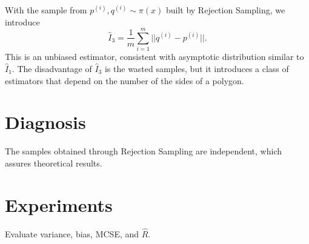\documentclass[a4paper,10pt, notitlepage]{report}
\begin{document}
With the sample from $p^{(i)}, q^{(i)} \sim \pi(x)$ built by Rejection Sampling, we
introduce 
$$
\hat{I}_3 = \frac{1}{m} \sum_{i=1}^m ||q^{(i)} - p^{(i)}||. 
$$
This is an unbiased estimator, consistent with asymptotic distribution 
similar to $\hat{I}_1$. The disadvantage of $\hat{I}_3$ is the wasted samples,
but it introduces a class of estimators that depend on the number of the sides
of a polygon. 

\section*{Diagnosis}

The samples obtained through Rejection Sampling are independent, which assures
theoretical results. 

\section*{Experiments}

Evaluate variance, bias, MCSE, and $\hat{R}$. 



\end{document}

